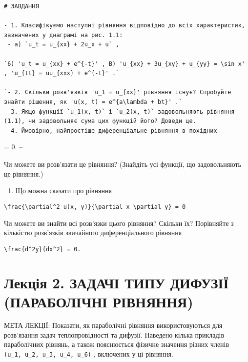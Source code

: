 \documentclass[
  ukrainian,
]{article}
\providecommand{\tightlist}{%
  \setlength{\itemsep}{0pt}\setlength{\parskip}{0pt}}
\begin{document}
\begin{verbatim}
# ЗАВДАННЯ

- 1. Класифікуємо наступні рівняння відповідно до всіх характеристик, зазначених у днаграмі на рис. 1.1:
 - a) `u_t = u_{xx} + 2u_x + u` ,

`6) 'u_t = u_{xx} + e^{-t}' , B) 'u_{xx} + 3u_{xy} + u_{yy} = \sin x' , 'u_{tt} = uu_{xxx} + e^{-t}' .`

`- 2. Скільки розв'язків 'u_1 = u_{xx}' рівняння існує? Спробуйте знайти рішення, як 'u(x, t) = e^{a\lambda + bt}' .`
- 3. Якщо функції `u_1(x, t)` і `u_2(x, t)` задовольняють рівняння (1.1), чи задовольняє сума цих функцій його? Доведи це.
- 4. Ймовірно, найпростіше диференціальне рівняння в похідних —
\end{verbatim}

 = 0.
\textsubscript{}\textasciitilde{}

Чи можете ви розв'язати це рівняння? (Знайдіть усі функції, що
задовольняють це рівняння.)

\begin{enumerate}
\def\labelenumi{\arabic{enumi}.}
\setcounter{enumi}{4}
\tightlist
\item
  Що можна сказати про рівняння
\end{enumerate}

\begin{verbatim}
\frac{\partial^2 u(x, y)}{\partial x \partial y} = 0
\end{verbatim}

Чи можете ви знайти всі розв'язки цього рівняння? Скільки їх? Порівняйте
з кількістю розв'язків звичайного диференціального рівняння

\begin{verbatim}
\frac{d^2y}{dx^2} = 0.
\end{verbatim}

\section{Лекція 2. ЗАДАЧІ ТИПУ ДИФУЗІЇ (ПАРАБОЛІЧНІ
РІВНЯННЯ)}\label{ux43bux435ux43aux446ux456ux44f-2.-ux437ux430ux434ux430ux447ux456-ux442ux438ux43fux443-ux434ux438ux444ux443ux437ux456ux457-ux43fux430ux440ux430ux431ux43eux43bux456ux447ux43dux456-ux440ux456ux432ux43dux44fux43dux43dux44f}

МЕТА ЛЕКЦІЇ: Показати, як параболічні рівняння використовуються для
розв'язання задач теплопровідності та дифузії. Наведено кілька прикладів
параболічних рівнянь, а також пояснюється фізичне значення різних членів
\texttt{(u\_1,\ u\_2,\ u\_3,\ u\_4,\ u\_6)} , включених у ці рівняння.
\end{document}
